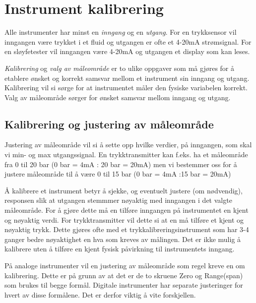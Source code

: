 
\chapter{Instrument kalibrering}

Alle instrumenter har minst en \textit{inngang} og en \textit{utgang}. For en trykksensor vil inngangen være trykket i et fluid og utgangen er ofte et 4-20mA strømsignal. For en sløyfetester vil inngangen være 4-20mA og utgangen et display som kan leses. 

\textit{Kalibrering} og \textit{valg av måleområde} er to ulike oppgaver som må gjøres for å etablere ønsket og korrekt samsvar mellom et instrument sin inngang og utgang. Kalibrering vil si sørge for at instrumentet måler den fysiske variabelen korrekt. Valg av måleområde sørger for ønsket samsvar mellom inngang og utgang. 





\filbreak
\section{Kalibrering og justering av måleområde}

Justering av måleområde vil si å sette opp hvilke verdier, på inngangen, som  skal vi min- og max utgangssignal. En trykktransmitter kan f.eks. ha et måleområde fra 0 til 20 bar (0 bar = 4mA : 20 bar = 20mA) men vi bestemmer oss for å justere måleområde til å være 0 til 15 bar (0 bar = 4mA :15 bar = 20mA)

Å kalibrere et instrument betyr å sjekke, og eventuelt justere (om nødvendig), responsen slik at utgangen stemmmer nøyaktig med inngangen i det valgte måleområde. For å gjøre dette må en tilføre inngangen på instrumentet en kjent og nøyaktig verdi. For trykktransmitter vil dette si at en må tilføre et kjent og nøyaktig trykk. Dette gjøres ofte med et trykkalibreringsinstrument som har 3-4 ganger bedre nøyaktighet en hva som kreves av målingen. Det er ikke mulig å kalibrere uten å tilføre en kjent fysisk påvirkning til instrumentets inngang. 

På analoge instrumenter vil en justering av måleområde som regel kreve en om kalibrering. Dette er på grunn av  at det er de to skruene Zero og Range(span) som brukes til begge formål. Digitale instrumenter har separate justeringer for hvert av disse formålene. Det er derfor viktig å vite forskjellen. 





